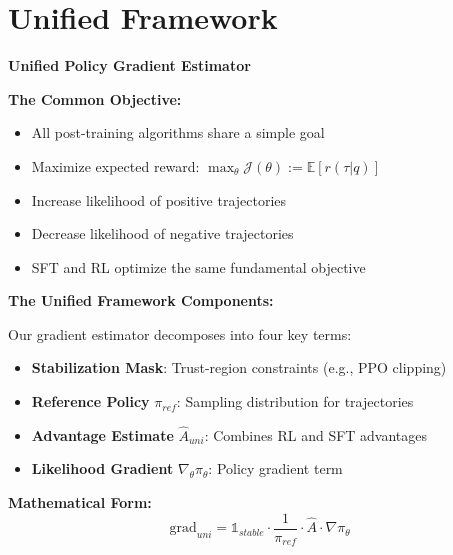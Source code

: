 \section{Unified Framework}%
\begin{frame}
\begin{center}
\Large \textbf{Unified Policy Gradient Estimator}
\end{center}

\vspace{0.3cm}

\textbf{The Common Objective:}
\begin{itemize}
    \item All post-training algorithms share a simple goal
    \item Maximize expected reward: $\max_{\theta} \mathcal{J}(\theta) := \mathbb{E}[r(\tau|q)]$
    \item Increase likelihood of positive trajectories
    \item Decrease likelihood of negative trajectories
    \item SFT and RL optimize the same fundamental objective
\end{itemize}
\end{frame}%
\begin{frame}
\textbf{The Unified Framework Components:}

\vspace{0.2cm}

Our gradient estimator decomposes into four key terms:

\begin{itemize}
    \item \textbf{Stabilization Mask}: Trust-region constraints (e.g., PPO clipping)
    \item \textbf{Reference Policy} $\pi_{ref}$: Sampling distribution for trajectories
    \item \textbf{Advantage Estimate} $\widehat{A}_{uni}$: Combines RL and SFT advantages
    \item \textbf{Likelihood Gradient} $\nabla_\theta \pi_\theta$: Policy gradient term
\end{itemize}

\vspace{0.2cm}

\textbf{Mathematical Form:}
\[
\mathrm{grad}_{uni} = \mathbb{1}_{stable} \cdot \frac{1}{\pi_{ref}} \cdot \hat{A} \cdot \nabla \pi_\theta
\]
\end{frame}%
